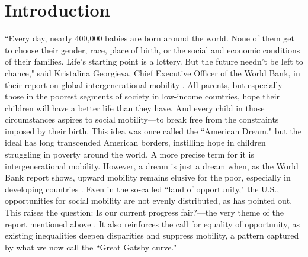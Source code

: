 \section{Introduction}

``Every day, nearly 400,000 babies are born around the world. None of them get to choose their gender, race, place of birth, or the social and economic conditions of their families. Life’s starting point is a lottery. But the future needn’t be left to chance," said Kristalina Georgieva, Chief Executive Officer of the World Bank, in their report on global intergenerational mobility \citep{narayan2018fair}. All parents, but especially those in the poorest segments of society in low-income countries, hope their children will have a better life than they have. And every child in those circumstances aspires to social mobility—to break free from the constraints imposed by their birth. This idea was once called the ``American Dream," but the ideal has long transcended American borders, instilling hope in children struggling in poverty around the world. A more precise term for it is intergenerational mobility. However, a dream is just a dream when, as the World Bank report shows, upward mobility remains elusive for the poor, especially in developing countries \citep{narayan2018fair}. Even in the so-called ``land of opportunity," the U.S., opportunities for social mobility are not evenly distributed, as \citet{chetty2014land} has pointed out. This raises the question: Is our current progress fair?—the very theme of the report mentioned above \citep{narayan2018fair}. It also reinforces the call for equality of opportunity, as existing inequalities deepen disparities and suppress mobility, a pattern captured by what we now call the ``Great Gatsby curve."

